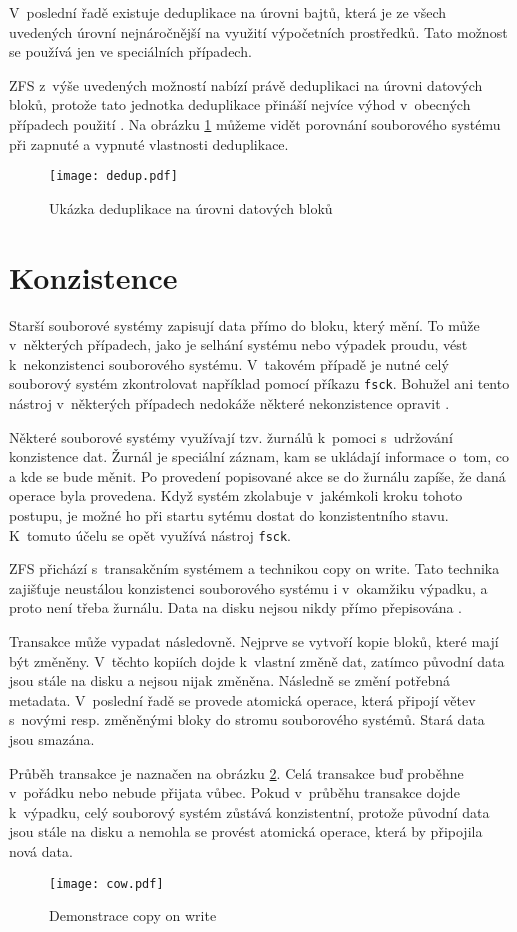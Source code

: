 V~poslední řadě existuje deduplikace na úrovni bajtů, která je ze všech uvedených úrovní nejnáročnější na využití výpočetních prostředků. Tato možnost se používá jen ve speciálních případech.

ZFS z~výše uvedených možností nabízí právě deduplikaci na úrovni datových bloků, protože tato jednotka deduplikace přináší nejvíce výhod v~obecných případech použití \cite{dedup}. Na obrázku \ref{blockdedup} můžeme vidět porovnání souborového systému při zapnuté a vypnuté vlastnosti deduplikace.
\begin{figure}
    \texttt{[image: dedup.pdf]}
    \caption{Ukázka deduplikace na úrovni datových bloků}
    \label{blockdedup}
\end{figure}
\section{Konzistence}
\label{consitence}
Starší souborové systémy zapisují data přímo do bloku, který mění. To může v~některých případech, jako je selhání systému nebo výpadek proudu, vést k~nekonzistenci souborového systému. V~takovém případě je nutné celý souborový systém zkontrolovat například pomocí příkazu \verb|fsck|. Bohužel ani tento nástroj v~některých případech nedokáže některé nekonzistence opravit \cite{transaction}.

Některé souborové systémy využívají tzv. žurnálů k~pomoci s~udržování konzistence dat. Žurnál je speciální záznam, kam se ukládají informace o~tom, co a kde se bude měnit. Po provedení popisované akce se do žurnálu zapíše, že daná operace byla provedena. Když systém zkolabuje v~jakémkoli kroku tohoto postupu, je možné ho při startu sytému dostat do konzistentního stavu. K~tomuto účelu se opět využívá nástroj \verb|fsck|.

ZFS přichází s~transakčním systémem a technikou copy on write. Tato technika zajišťuje neustálou konzistenci souborového systému i v~okamžiku výpadku, a proto není třeba žurnálu. Data na disku nejsou nikdy přímo přepisována \cite{transaction}.

Transakce může vypadat následovně. Nejprve se vytvoří kopie bloků, které mají být změněny. V~těchto kopiích dojde k~vlastní změně dat, zatímco původní data jsou stále na disku a nejsou nijak změněna. Následně se změní potřebná metadata. V~poslední řadě se provede atomická operace, která připojí větev s~novými resp. změněnými bloky do stromu souborového systémů. Stará data jsou smazána.

Průběh transakce je naznačen na obrázku \ref{cow}. Celá transakce buď proběhne v~pořádku nebo nebude přijata vůbec. Pokud v~průběhu transakce dojde k~výpadku, celý souborový systém zůstává konzistentní, protože původní data jsou stále na disku a nemohla se provést atomická operace, která by připojila nová data.
\begin{figure}
    \centering
    \texttt{[image: cow.pdf]}
    \caption{Demonstrace copy on write}
    \label{cow}
\end{figure}
